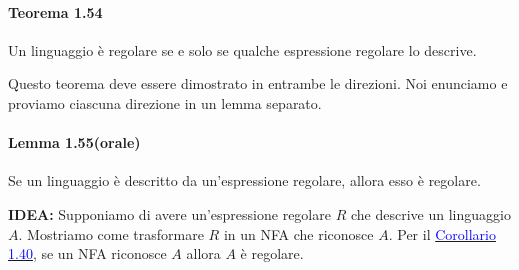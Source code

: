 \documentclass{article}
\begin{document}
\paragraph{Teorema 1.54}
\label{teorema-1.54}
\text{  }
\begin{tcolorbox}[colback=green!10!white, colframe=green!50!black, title=Teorema 1.54]
    Un linguaggio è regolare se e solo se qualche espressione regolare lo descrive.
\end{tcolorbox}

Questo teorema deve essere dimostrato in entrambe le direzioni. Noi enunciamo e proviamo ciascuna direzione in un lemma separato.

\paragraph{Lemma 1.55(orale)}
\label{lemma-1.55}
\text{  }
\begin{tcolorbox}[colback=orange!10!white, colframe=orange!50!black, title=Lemma 1.55 (orale)]
    Se un linguaggio è descritto da un'espressione regolare, allora esso è regolare.
\end{tcolorbox}

\textbf{IDEA:}
Supponiamo di avere un'espressione regolare $R$ che descrive un linguaggio $A$. Mostriamo come trasformare $R$ in un NFA che riconosce $A$.
Per il \hyperref[corollario-1.40]{\textcolor{blue}{Corollario 1.40}}, se un NFA riconosce $A$ allora $A$ è regolare.
\vspace{1em}
\end{document}
